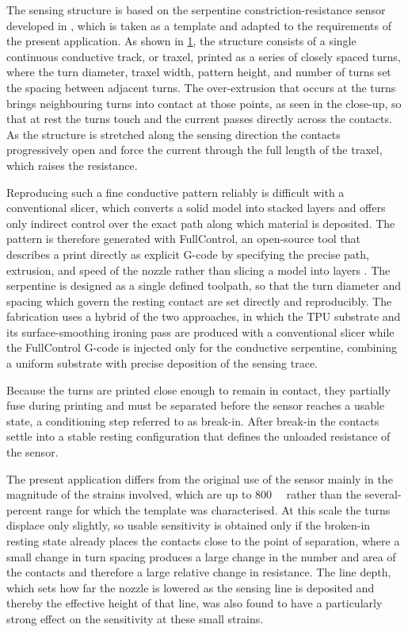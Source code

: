 The sensing structure is based on the serpentine constriction-resistance sensor developed in \cite{G.O.A.T}, which is taken as a template and adapted to the requirements of the present application. As shown in \cref{fig:serpentine}, the structure consists of a single continuous conductive track, or traxel, printed as a series of closely spaced turns, where the turn diameter, traxel width, pattern height, and number of turns set the spacing between adjacent turns. The over-extrusion that occurs at the turns brings neighbouring turns into contact at those points, as seen in the close-up, so that at rest the turns touch and the current passes directly across the contacts. As the structure is stretched along the sensing direction the contacts progressively open and force the current through the full length of the traxel, which raises the resistance.

\begin{figure}
\centering

    \caption{}
    \label{fig:serpentine}
\end{figure}

Reproducing such a fine conductive pattern reliably is difficult with a conventional slicer, which converts a solid model into stacked layers and offers only indirect control over the exact path along which material is deposited. The pattern is therefore generated with FullControl, an open-source tool that describes a print directly as explicit G-code by specifying the precise path, extrusion, and speed of the nozzle rather than slicing a model into layers \cite{fullcontrol}. The serpentine is designed as a single defined toolpath, so that the turn diameter and spacing which govern the resting contact are set directly and reproducibly. The fabrication uses a hybrid of the two approaches, in which the TPU substrate and its surface-smoothing ironing pass are produced with a conventional slicer while the FullControl G-code is injected only for the conductive serpentine, combining a uniform substrate with precise deposition of the sensing trace.

Because the turns are printed close enough to remain in contact, they partially fuse during printing and must be separated before the sensor reaches a usable state, a conditioning step referred to as break-in. After break-in the contacts settle into a stable resting configuration that defines the unloaded resistance of the sensor.

The present application differs from the original use of the sensor mainly in the magnitude of the strains involved, which are up to \SI{800}{\micro\strain} rather than the several-percent range for which the template was characterised. At this scale the turns displace only slightly, so usable sensitivity is obtained only if the broken-in resting state already places the contacts close to the point of separation, where a small change in turn spacing produces a large change in the number and area of the contacts and therefore a large relative change in resistance. The line depth, which sets how far the nozzle is lowered as the sensing line is deposited and thereby the effective height of that line, was also found to have a particularly strong effect on the sensitivity at these small strains.